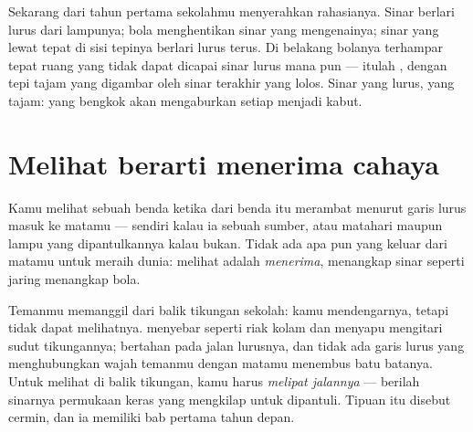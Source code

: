 \begin{example}\label{ex:g4:light-straight-lines:shadows}
Sekarang  dari tahun pertama sekolahmu menyerahkan
rahasianya. Sinar berlari lurus dari lampunya; bola menghentikan sinar
yang mengenainya; sinar yang lewat tepat di sisi tepinya berlari lurus
terus. Di belakang bolanya terhampar tepat ruang yang tidak dapat
dicapai sinar lurus mana pun --- itulah , dengan tepi
tajam yang digambar oleh sinar terakhir yang lolos. Sinar yang lurus,
 yang tajam:  yang bengkok akan mengaburkan setiap
 menjadi kabut.
\end{example}

\section{Melihat berarti menerima cahaya}

\begin{proposition}\label{prop:g4:light-straight-lines:seeing}
Kamu melihat sebuah benda ketika  dari benda itu merambat
menurut garis lurus masuk ke matamu ---  sendiri kalau ia
sebuah sumber, atau  matahari maupun  lampu yang
dipantulkannya kalau bukan. Tidak ada apa pun yang keluar dari matamu
untuk meraih dunia: melihat adalah \emph{menerima}, menangkap sinar
seperti jaring menangkap bola.
\end{proposition}

\begin{example}\label{ex:g4:light-straight-lines:corner}
Temanmu memanggil dari balik tikungan sekolah: kamu mendengarnya,
tetapi tidak dapat melihatnya.  menyebar seperti riak kolam dan
menyapu mengitari sudut tikungannya;  bertahan pada jalan
lurusnya, dan tidak ada garis lurus yang menghubungkan wajah temanmu
dengan matamu menembus batu batanya. Untuk melihat di balik tikungan,
kamu harus \emph{melipat jalannya} --- berilah sinarnya permukaan
keras yang mengkilap untuk dipantuli. Tipuan itu disebut cermin, dan
ia memiliki bab  pertama tahun depan.
\end{example}

